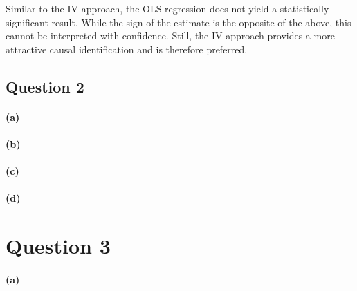 \documentclass{scrartcl}
\begin{document}
Similar to the IV approach, the OLS regression does not yield a statistically significant result. While the sign of the estimate is the opposite of the above, this cannot be interpreted with confidence. Still, the IV approach provides a more attractive causal identification and is therefore preferred.

\subsection*{Question 2}

\paragraph*{(a)}



\paragraph*{(b)}

\paragraph*{(c)}



\paragraph*{(d)}

\section*{Question 3}

\paragraph*{(a)}
\end{document}
